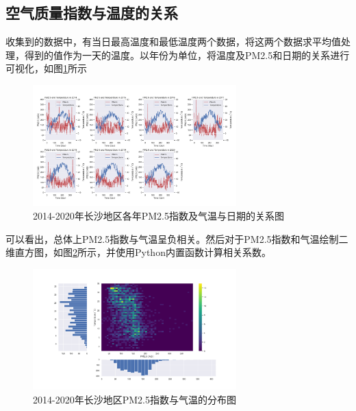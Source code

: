 \documentclass[UTF8,a4paper,10pt]{article}
\begin{document}
\subsection{空气质量指数与温度的关系}
\indent 收集到的数据中，有当日最高温度和最低温度两个数据，将这两个数据求平均值处理，得到的值作为一天的温度。以年份为单位，将温度及PM2.5和日期的关系进行可视化，如图\ref{Fig.main1}所示

\begin{figure}[H] %
\centering %
\includegraphics[width=0.7\textwidth]{fig//pm25-temp-alltime.png} %
\caption{2014-2020年长沙地区各年PM2.5指数及气温与日期的关系图} %
\label{Fig.main1} %
\end{figure}

\indent 可以看出，总体上PM2.5指数与气温呈负相关。然后对于PM2.5指数和气温绘制二维直方图，如图\ref{Fig.main2}所示，并使用Python内置函数计算相关系数。

\begin{figure}[H] %
\centering %
\includegraphics[width=0.7\textwidth]{fig//pm25-temp.png} %
\caption{2014-2020年长沙地区PM2.5指数与气温的分布图} %
\label{Fig.main2} %
\end{figure}
\end{document}
